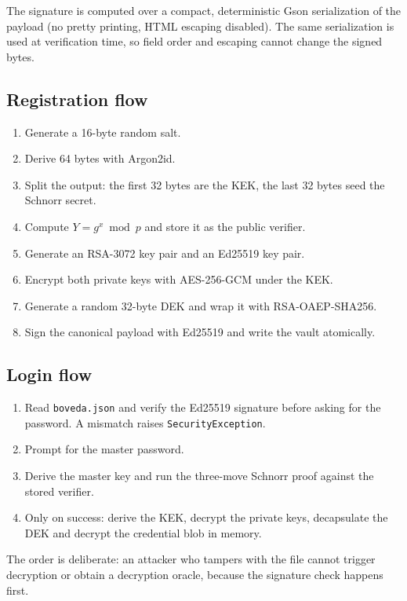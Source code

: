 \documentclass[11pt,a4paper]{article}
\newcommand{\code}[1]{\texttt{#1}}
\begin{document}
The signature is computed over a compact, deterministic Gson serialization of
the payload (no pretty printing, HTML escaping disabled). The same serialization
is used at verification time, so field order and escaping cannot change the
signed bytes.

\subsection{Registration flow}

\begin{enumerate}[leftmargin=*]
  \item Generate a 16-byte random salt.
  \item Derive 64 bytes with Argon2id.
  \item Split the output: the first 32 bytes are the KEK, the last 32 bytes seed
        the Schnorr secret.
  \item Compute $Y = g^{x} \bmod p$ and store it as the public verifier.
  \item Generate an RSA-3072 key pair and an Ed25519 key pair.
  \item Encrypt both private keys with AES-256-GCM under the KEK.
  \item Generate a random 32-byte DEK and wrap it with RSA-OAEP-SHA256.
  \item Sign the canonical payload with Ed25519 and write the vault atomically.
\end{enumerate}

\subsection{Login flow}

\begin{enumerate}[leftmargin=*]
  \item Read \code{boveda.json} and verify the Ed25519 signature before asking
        for the password. A mismatch raises \code{SecurityException}.
  \item Prompt for the master password.
  \item Derive the master key and run the three-move Schnorr proof against the
        stored verifier.
  \item Only on success: derive the KEK, decrypt the private keys, decapsulate
        the DEK and decrypt the credential blob in memory.
\end{enumerate}

The order is deliberate: an attacker who tampers with the file cannot trigger
decryption or obtain a decryption oracle, because the signature check happens
first.
\end{document}
